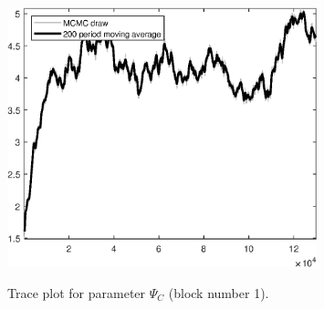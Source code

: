 \begin{figure}[H]
\centering
  \includegraphics[width=0.8\textwidth]{BRS_sectoral_wo_fixed_cost/graphs/TracePlot_Psi_C_blck_1}\\
    \caption{Trace plot for parameter ${\Psi_{C}}$ (block number 1).}
\end{figure}
